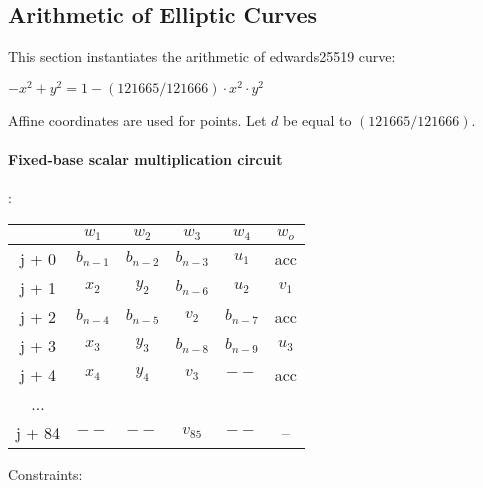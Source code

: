 \subsection{Arithmetic of Elliptic Curves} \label{ellcurve}
This section instantiates the arithmetic of edwards25519 curve:
\begin{center}
$- x^2 + y^2 = 1 - (121665/121666) \cdot x^2 \cdot y^2$
\end{center}
Affine coordinates are used for points. 
Let $d$ be equal to $(121665/121666)$.

\paragraph{Fixed-base scalar multiplication circuit}:
\begin{center}
\begin{tabular}{ |c|c|c|c|c|c } 
  & $w_1$ & $w_2$ & $w_3$ & $w_4$ & $w_o$\\ 
 \hline
j + 0 & $b_{n - 1}$ & $b_{n - 2}$ & $b_{n - 3}$ & $u_1$ & acc\\ 
j + 1 & $x_2$ & $y_2$ & $b_{n - 6}$ & $u_2$ & $v_1$\\ 
j + 2 & $b_{n - 4}$ & $b_{n - 5}$ & $v_2$ & $b_{n - 7}$ & acc\\ 
j + 3 & $x_3$ & $ y_3$ & $b_{n - 8}$ & $b_{n - 9}$ & $u_3$\\ 
j + 4 & $x_4$ & $y_4$ & $v_3$ & $--$ & acc\\ 
... & & & & &\\ 
j + 84 & $--$ & $--$ & $v_{85}$ & $--$ & --\\ 

 \hline
\end{tabular}
\end{center}
 Constraints:
